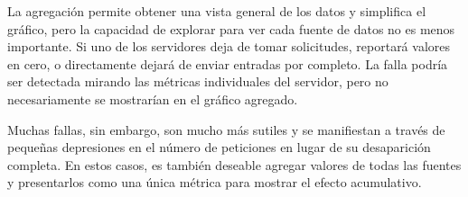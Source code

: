 La agregación permite obtener una vista general de los datos y simplifica el gráfico, pero la capacidad de explorar para ver cada fuente de datos no es menos importante. Si  uno de los servidores deja de tomar solicitudes, reportará valores en cero, o directamente dejará de enviar entradas por completo. La falla podría ser detectada mirando las métricas individuales del servidor, pero no necesariamente se mostrarían en el gráfico agregado.

Muchas fallas, sin embargo, son mucho más sutiles y se manifiestan a través de pequeñas depresiones en el número de peticiones en lugar de su desaparición completa. En estos casos, es también deseable agregar valores de todas las fuentes y presentarlos como una única métrica para mostrar el efecto acumulativo. \cite[p.~21-25]{monitoreo:efective_monitoring_and_alerting}

